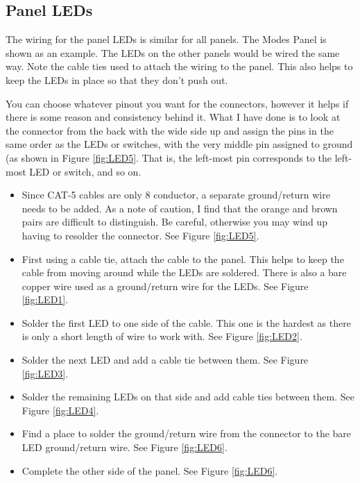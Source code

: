 \documentclass[10pt, openany]{book}
\begin{document}
\clearpage
\subsection{Panel LEDs}
\label{subsec:PanelLED}
The wiring for the panel LEDs is similar for all panels.  The Modes Panel is shown as an example.  The LEDs on the other panels would be wired the same way.  Note the cable ties used to attach the wiring to the panel.  This also helps to keep the LEDs in place so that they don't push out.

You can choose whatever pinout you want for the connectors, however it helps if there is some reason and consistency behind it.  What I have done is to look at the connector from the back with the wide side up and assign the pins in the same order as the LEDs or switches, with the very middle pin assigned to ground (as shown in Figure \ref{fig:LED5}.  That is, the left-most pin corresponds to the left-most LED or switch, and so on.

\begin{itemize}
  \item Since CAT-5 cables are only 8 conductor, a separate ground/return wire needs to be added.  As a note of caution, I find that the orange and brown pairs are difficult to distinguish.  Be careful, otherwise you may wind up having to resolder the connector.  See Figure \ref{fig:LED5}.
  \item First using a cable tie, attach the cable to the panel.  This helps to keep the cable from moving around while the LEDs are soldered.  There is also a bare copper wire used as a ground/return wire for the LEDs.  See Figure \ref{fig:LED1}.
  \item Solder the first LED to one side of the cable.  This one is the hardest as there is only a short length of wire to work with.  See Figure \ref{fig:LED2}.
  \item Solder the next LED and add a cable tie between them.  See Figure \ref{fig:LED3}.
  \item Solder the remaining LEDs on that side and add cable ties between them.  See Figure \ref{fig:LED4}.
  \item Find a place to solder the ground/return wire from the connector to the bare LED ground/return wire.  See Figure \ref{fig:LED6}.
  \item Complete the other side of the panel.  See Figure \ref{fig:LED6}.
\end{itemize}
\end{document}

